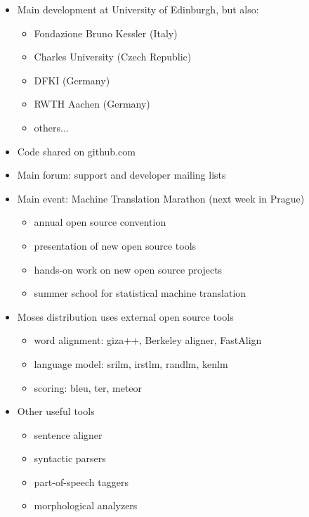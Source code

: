 \documentclass[landscape]{uedslides2C}
\begin{document}
\begin{itemize} \itemsep -1mm
\item Main development at University of Edinburgh, but also: \vspace{-3mm}
\begin{itemize}
\item Fondazione Bruno Kessler (Italy)
\item Charles University (Czech Republic)
\item DFKI (Germany)
\item RWTH Aachen (Germany)
\item others...
\end{itemize}
\item Code shared on github.com
\item Main forum: support and developer mailing lists
\item Main event: Machine Translation Marathon (next week in Prague)\vspace{-3mm}
\begin{itemize}
\item annual open source convention
\item presentation of new open source tools
\item hands-on work on new open source projects
\item summer school for statistical machine translation
\end{itemize}
\end{itemize}


\vspace{10mm}
\begin{itemize}
\item Moses distribution uses external open source tools
\begin{itemize}
\item word alignment: {\sc giza++}, Berkeley aligner, FastAlign
\item language model: {\sc srilm}, {\sc irstlm}, {\sc randlm}, {\sc kenlm}
\item scoring: {\sc bleu}, {\sc ter}, {\sc meteor}
\end{itemize}
\item Other useful tools
\begin{itemize}
\item sentence aligner
\item syntactic parsers
\item part-of-speech taggers
\item morphological analyzers
\end{itemize}
\end{itemize}
\end{document}
